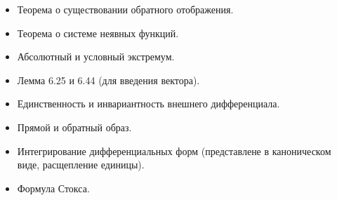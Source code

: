 \begin{itemize}
    \item Теорема о существовании обратного отображения.
    \item Теорема о системе неявных функций.
    \item Абсолютный и условный экстремум.
    \item Лемма 6.25 и 6.44 (для введения вектора).
    \item Единственность и инвариантность внешнего дифференциала.
    \item Прямой и обратный образ.
    \item Интегрирование дифференциальных форм (представлене в каноническом виде, расщепление единицы).
    \item Формула Стокса.
\end{itemize}